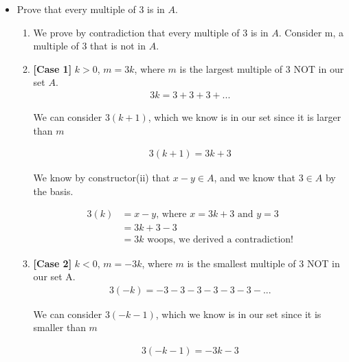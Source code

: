 \documentclass{article}
\begin{document}
\begin{itemize}
            \item Prove that every multiple of 3 is in $A$.
            \begin{enumerate}[label=\arabic*.]
                \item We prove by contradiction that every multiple of 3 is in $A$. Consider m, a multiple of 3 that is not in $A$.
                \item \textbf{[Case 1]} $k > 0$, $m = 3k$, where $m$ is the largest multiple of 3 NOT in our set $A$.
                \begin{align*}
                    3k = 3 + 3 + 3 + ...
                \end{align*}
                \begin{center}
                    We can consider $3(k+1)$, which we know is in our set since it is larger than $m$
                \end{center}
                \begin{align*}
                    3(k+1) = 3k+3
                \end{align*}
                \begin{center}
                    We know by constructor(ii) that $x-y \in A$, and we know that $3 \in A$ by the basis.
                \end{center}
                \begin{align*}
                    3(k) &= x - y \text{, where } x = 3k + 3 \text{ and } y = 3\\
                         &= 3k + 3 - 3\\
                         &= 3k \text{ woops, we derived a contradiction!}
                \end{align*}
                \item \textbf{[Case 2]} $k < 0$, $m = -3k$, where $m$ is the smallest multiple of 3 NOT in our set A.
                \begin{align*}
                    3(-k) = -3 -3 -3 -3 -3 -3 -...
                \end{align*}
                \begin{center}
                    We can consider $3(-k - 1)$, which we know is in our set since it is smaller than $m$
                \end{center}
                \begin{align*}
                    3(-k-1) = -3k-3
                \end{align*}
                \begin{center}

\end{center}
\end{enumerate}
\end{itemize}
\end{document}
